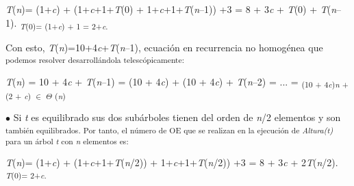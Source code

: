\documentclass[12pt]{article}
\renewcommand{\_}{\kern-1.5pt\textunderscore\kern-1.5pt}
\begin{document}
\begin{adjustwidth}{0.87in}{0.82in}
{\fontsize{10pt}{12.0pt}\selectfont \textit{T}(\textit{n})= (1+\textit{c}) + (1+\textit{c}+1+\textit{T}(0) + 1+\textit{c}+1+\textit{T}(\textit{n}–1)) +3 = 8 + 3\textit{c }+ \textit{T}(0) + \textit{T}(\textit{n}–1). \textit{\textsubscript{T}}\textsubscript{(0)= (1+\textit{c}) + 1 = 2+\textit{c}. }\par}\par

\end{adjustwidth}

\begin{adjustwidth}{0.77in}{0.57in}
{\fontsize{10pt}{12.0pt}\selectfont Con esto, \textit{T}(\textit{n})=10+4\textit{c}+\textit{T}(\textit{n}–1), ecuación en recurrencia no homogénea que \textsubscript{podemos resolver desarrollándola telescópicamente: }\par}\par

\end{adjustwidth}

\begin{adjustwidth}{1.17in}{1.2in}
{\fontsize{10pt}{12.0pt}\selectfont \textit{T}(\textit{n}) = 10 + 4\textit{c }+ \textit{T}(\textit{n}–1) = (10 + 4\textit{c}) + (10 + 4\textit{c}) + \textit{T}(\textit{n}–2) = ... = \textsubscript{(10 + 4\textit{c})\textit{n }+ (2 + \textit{c}) $ \in $  $ \Theta $ (\textit{n}) }\par}\par

\end{adjustwidth}

\begin{adjustwidth}{0.57in}{0.57in}
{\fontsize{10pt}{12.0pt}\selectfont $\bullet$  Si \textit{t }es equilibrado sus dos subárboles tienen del orden de \textit{n}/2 elementos y son \textsubscript{también equilibrados\textit{. }Por tanto, el número de OE que se realizan en la ejecución de \textit{Altura(t) }para un árbol \textit{t }con \textit{n }elementos es: }\par}\par

\end{adjustwidth}

\begin{adjustwidth}{1.17in}{0.77in}
{\fontsize{10pt}{12.0pt}\selectfont \textit{T}(\textit{n})= (1+\textit{c}) + (1+\textit{c}+1+\textit{T}(\textit{n}/2)) + 1+\textit{c}+1+\textit{T}(\textit{n}/2)) +3 = 8 + 3\textit{c }+ 2\textit{T}(\textit{n}/2). \textit{\textsubscript{T}}\textsubscript{(0)= 2+\textit{c}. }\par}\par

\end{adjustwidth}
\end{document}
